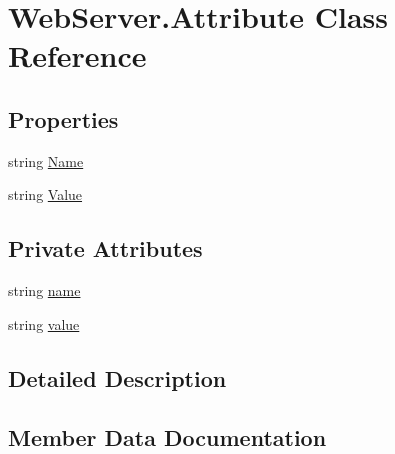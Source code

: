 \hypertarget{class_web_server_1_1_attribute}{}\section{Web\+Server.\+Attribute Class Reference}
\label{class_web_server_1_1_attribute}


 


\subsection*{Properties}
\begin{DoxyCompactItemize}
\item 
string \hyperlink{class_web_server_1_1_attribute_a25e49afca3e183b15702755d6a39f068}{Name}
\item 
string \hyperlink{class_web_server_1_1_attribute_aa6374098e87bcd66254e8cf74cebf2d5}{Value}
\end{DoxyCompactItemize}
\subsection*{Private Attributes}
\begin{DoxyCompactItemize}
\item 
string \hyperlink{class_web_server_1_1_attribute_ac82f87d1d69c4eda39a2b5ff82ce5b59}{name}
\item 
string \hyperlink{class_web_server_1_1_attribute_a6d17471af2e949eda4cc0745c99b44ed}{value}
\end{DoxyCompactItemize}


\subsection{Detailed Description}




\subsection{Member Data Documentation}
\mbox{\label{class_web_server_1_1_attribute_ac82f87d1d69c4eda39a2b5ff82ce5b59}} 
